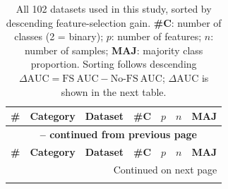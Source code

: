 \documentclass[preprint,12pt,authoryear]{elsarticle}
\begin{document}
\appendix
{\footnotesize
\begin{longtable}{@{}r p{1.9cm} p{6.7cm} r r r r@{}}
\caption{All 102 datasets used in this study, sorted by descending feature-selection gain. \textbf{\#C}: number of classes (2 = binary); \textbf{$p$}: number of features; \textbf{$n$}: number of samples; \textbf{MAJ}: majority class proportion. Sorting follows descending $\Delta\mathrm{AUC}=\mathrm{FS\ AUC}-\mathrm{No\text{-}FS\ AUC}$; $\Delta\mathrm{AUC}$ is shown in the next table.}
\label{tab:all_datasets} \\
\toprule
\textbf{\#} & \textbf{Category} & \textbf{Dataset} & \textbf{\#C} & \textbf{$p$} & \textbf{$n$} & \textbf{MAJ} \\
\midrule
\endfirsthead
\multicolumn{7}{c}{{\bfseries \tablename\ \thetable{} -- continued from previous page}} \\
\toprule
\textbf{\#} & \textbf{Category} & \textbf{Dataset} & \textbf{\#C} & \textbf{$p$} & \textbf{$n$} & \textbf{MAJ} \\
\midrule
\endhead
\midrule
\multicolumn{7}{r}{{Continued on next page}} \\
\endfoot
\bottomrule
\endlastfoot


\end{longtable}}
\end{document}
